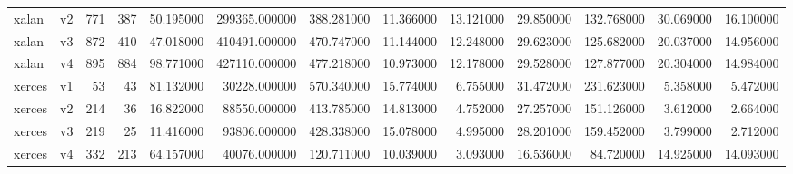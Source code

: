 \begin{table}
\begin{tabular}{llrrrrrrrrrrr}
xalan & v2 & 771 & 387 & 50.195000 & 299365.000000 & 388.281000 & 11.366000 & 13.121000 & 29.850000 & 132.768000 & 30.069000 & 16.100000 \\
xalan & v3 & 872 & 410 & 47.018000 & 410491.000000 & 470.747000 & 11.144000 & 12.248000 & 29.623000 & 125.682000 & 20.037000 & 14.956000 \\
xalan & v4 & 895 & 884 & 98.771000 & 427110.000000 & 477.218000 & 10.973000 & 12.178000 & 29.528000 & 127.877000 & 20.304000 & 14.984000 \\
xerces & v1 & 53 & 43 & 81.132000 & 30228.000000 & 570.340000 & 15.774000 & 6.755000 & 31.472000 & 231.623000 & 5.358000 & 5.472000 \\
xerces & v2 & 214 & 36 & 16.822000 & 88550.000000 & 413.785000 & 14.813000 & 4.752000 & 27.257000 & 151.126000 & 3.612000 & 2.664000 \\
xerces & v3 & 219 & 25 & 11.416000 & 93806.000000 & 428.338000 & 15.078000 & 4.995000 & 28.201000 & 159.452000 & 3.799000 & 2.712000 \\
xerces & v4 & 332 & 213 & 64.157000 & 40076.000000 & 120.711000 & 10.039000 & 3.093000 & 16.536000 & 84.720000 & 14.925000 & 14.093000 \\
\bottomrule
\end{tabular}
\end{table}
